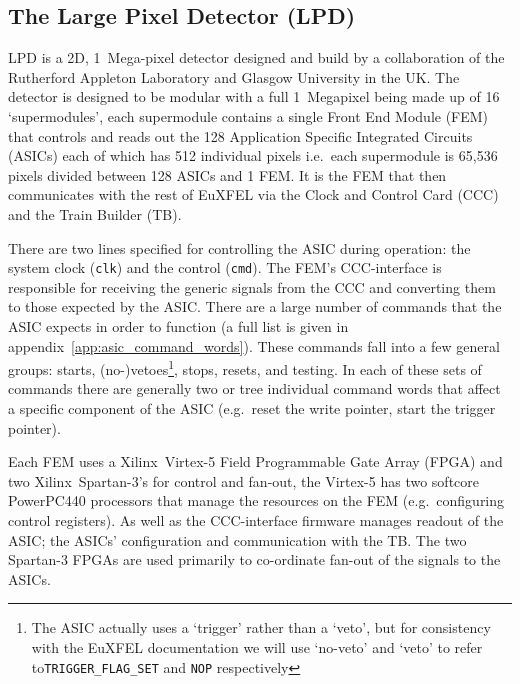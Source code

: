 \subsection{The Large Pixel Detector (LPD)} %
\label{sub:the_large_pixel_detector_lpd}
LPD is a 2D, 1~Mega-pixel detector designed and build by a collaboration of the Rutherford Appleton Laboratory and Glasgow University in the UK. The detector is designed to be modular with a full 1~Megapixel being made up of 16 `supermodules', each supermodule contains a single Front End Module (FEM) that controls and reads out the 128 Application Specific Integrated Circuits (ASICs) each of which has 512 individual pixels i.e.\ each supermodule is 65,536 pixels divided between 128 ASICs and 1 FEM. It is the FEM that then communicates with the rest of EuXFEL via the Clock and Control Card (CCC) and the Train Builder (TB).
    
There are two lines specified for controlling the ASIC during operation: the system clock (\texttt{clk}) and the control (\texttt{cmd}). The FEM's CCC-interface is responsible for receiving the generic signals from the CCC and converting them to those expected by the ASIC. There are a large number of commands that the ASIC expects in order to function (a full list is given in appendix~\ref{app:asic_command_words}). These commands fall into a few general groups: starts, (no-)vetoes\footnote{The ASIC actually uses a `trigger' rather than a `veto', but for consistency with the EuXFEL documentation we will use `no-veto' and `veto' to refer to\texttt{TRIGGER\_FLAG\_SET} and \texttt{NOP} respectively}, stops, resets, and testing. In each of these sets of commands there are generally two or tree individual command words that affect a specific component of the ASIC (e.g.\ reset the write pointer, start the trigger pointer). 
    
Each FEM uses a Xilinx~Virtex-5 Field Programmable Gate Array (FPGA) and two Xilinx~Spartan-3's for control and fan-out, the Virtex-5 has two softcore PowerPC440 processors that manage the resources on the FEM (e.g.\ configuring control registers). As well as the CCC-interface firmware manages readout of the ASIC; the ASICs' configuration and communication with the TB. The two Spartan-3 FPGAs are used primarily to co-ordinate fan-out of the signals to the ASICs.
